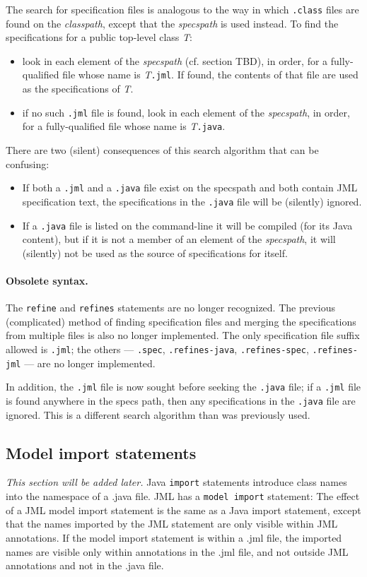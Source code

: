 The search for specification files is analogous to the way in  which \texttt{.class} files are found on the {\it classpath}, except that the {\it specspath} is used instead. To find the specifications for a public top-level class {\it T}:
\begin{itemize} 
\item look in each element of the {\it specspath} (cf. section TBD), in order, for a fully-qualified file whose name is {\it T}{\tt .jml}.
If found, the contents of that file are used as the specifications of {\it T}.
\item if no such \texttt{.jml} file is found, look in each element of the {\it specspath}, in order, for a fully-qualified file whose name is {\it T}{\tt .java}.
\end{itemize}
There are two (silent) consequences of this search algorithm that can be confusing:
\begin{itemize}
\item If both a \texttt{.jml} and a \texttt{.java} file exist on the specspath and both contain JML specification text, the specifications in the \texttt{.java} file will be (silently) ignored.
\item If a \texttt{.java} file is listed on the command-line it will be compiled (for its Java content), but if it is not a member of an element of the {\it specspath}, it will (silently) not be used as the source of specifications for itself.
\end{itemize}

\paragraph{Obsolete syntax.} The {\tt refine} and {\tt refines} statements are no longer recognized.
The previous (complicated) method of finding specification files and merging the specifications
from multiple files is also no longer implemented. The only specification file suffix allowed is 
{\tt .jml}; the others --- {\tt .spec}, {\tt .refines-java}, {\tt .refines-spec}, {\tt .refines-jml} --- 
are no longer implemented.

In addition, the {\tt .jml} file is now sought before seeking the {\tt .java} file; if a {\tt .jml}
file is found anywhere in the specs path, then any specifications in the {\tt .java} file are 
ignored. This is a different search algorithm than was previously used.

\subsection{Model import statements}
\textit{This section will be added later.} %
Java \texttt{import} statements introduce class names into the namespace of a .java file.
JML has a \texttt{model import} statement:
The effect of a JML model import statement is the same as a Java import statement, except that the names imported by the JML statement are only visible within JML annotations. If the model import statement is within a .jml file, the imported names are
visible only within annotations in the .jml file, and not outside JML annotations and not in the .java file.

